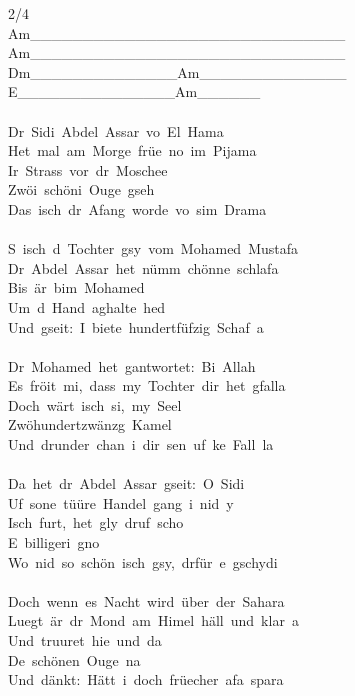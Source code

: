 \documentclass[]{book}
\begin{document}
2/4\\
\textbar Am\_\_\_\_\_\_\textbar\_\_\_\_\_\_\_\_\textbar\_\_\_\_\_\_\_\_\textbar\_\_\_\_\_\_\_\_\textbar{}\\
\textbar Am\_\_\_\_\_\_\textbar\_\_\_\_\_\_\_\_\textbar\_\_\_\_\_\_\_\_\textbar\_\_\_\_\_\_\_\_\textbar{}\\
\textbar Dm\_\_\_\_\_\_\textbar\_\_\_\_\_\_\_\_\textbar Am\_\_\_\_\_\_\textbar\_\_\_\_\_\_\_\_\textbar{}\\
\textbar E\_\_\_\_\_\_\_\textbar\_\_\_\_\_\_\_\_\textbar Am\_\_\_\_\_\_\textbar{}\\
~\\
Dr~Sidi~Abdel~Assar~vo~El~Hama\\
Het~mal~am~Morge~früe~no~im~Pijama\\
Ir~Strass~vor~dr~Moschee\\
Zwöi~schöni~Ouge~gseh\\
Das~isch~dr~Afang~worde~vo~sim~Drama\\
~\\
S~isch~d~Tochter~gsy~vom~Mohamed~Mustafa\\
Dr~Abdel~Assar~het~nümm~chönne~schlafa\\
Bis~är~bim~Mohamed\\
Um~d~Hand~aghalte~hed\\
Und~gseit:~I~biete~hundertfüfzig~Schaf~a\\
~\\
Dr~Mohamed~het~gantwortet:~Bi~Allah\\
Es~fröit~mi,~dass~my~Tochter~dir~het~gfalla\\
Doch~wärt~isch~si,~my~Seel\\
Zwöhundertzwänzg~Kamel\\
Und~drunder~chan~i~dir~sen~uf~ke~Fall~la\\
~\\
Da~het~dr~Abdel~Assar~gseit:~O~Sidi\\
Uf~sone~tüüre~Handel~gang~i~nid~y\\
Isch~furt,~het~gly~druf~scho\\
E~billigeri~gno\\
Wo~nid~so~schön~isch~gsy,~drfür~e~gschydi\\
~\\
Doch~wenn~es~Nacht~wird~über~der~Sahara\\
Luegt~är~dr~Mond~am~Himel~häll~und~klar~a\\
Und~truuret~hie~und~da\\
De~schönen~Ouge~na\\
Und~dänkt:~Hätt~i~doch~früecher~afa~spara\\
~\\
\end{document}
